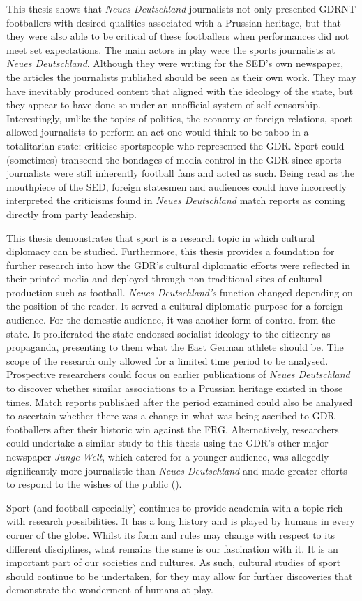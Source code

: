 This thesis shows that \textit{Neues Deutschland} journalists not only presented GDRNT footballers with desired qualities associated with a Prussian heritage, but that they were also able to be critical of these footballers when performances did not meet set expectations. The main actors in play were the sports journalists at \textit{Neues Deutschland}. Although they were writing for the SED’s own newspaper, the articles the journalists published should be seen as their own work. They may have inevitably produced content that aligned with the ideology of the state, but they appear to have done so under an unofficial system of self-censorship. Interestingly, unlike the topics of politics, the economy or foreign relations, sport allowed journalists to perform an act one would think to be taboo in a totalitarian state: criticise sportspeople who represented the GDR. Sport could (sometimes) transcend the bondages of media control in the GDR since sports journalists were still inherently football fans and acted as such. Being read as the mouthpiece of the SED, foreign statesmen and audiences could have incorrectly interpreted the criticisms found in \textit{Neues Deutschland} match reports as coming directly from party leadership.

This thesis demonstrates that sport is a research topic in which cultural diplomacy can be studied. Furthermore, this thesis provides a foundation for further research into how the GDR’s cultural diplomatic efforts were reflected in their printed media and deployed through non-traditional sites of cultural production such as football. \textit{Neues Deutschland’s} function changed depending on the position of the reader. It served a cultural diplomatic purpose for a foreign audience. For the domestic audience, it was another form of control from the state. It proliferated the state-endorsed socialist ideology to the citizenry as propaganda, presenting to them what the East German athlete should be. The scope of the research only allowed for a limited time period to be analysed. Prospective researchers could focus on earlier publications of \textit{Neues Deutschland} to discover whether similar associations to a Prussian heritage existed in those times. Match reports published after the period examined could also be analysed to ascertain whether there was a change in what was being ascribed to GDR footballers after their historic win against the FRG. Alternatively, researchers could undertake a similar study to this thesis using the GDR’s other major newspaper \textit{Junge Welt}, which catered for a younger audience, was allegedly significantly more journalistic than \textit{Neues Deutschland} and made greater efforts to respond to the wishes of the public (\cite{meyenschweiger2008}).

Sport (and football especially) continues to provide academia with a topic rich with research possibilities. It has a long history and is played by humans in every corner of the globe. Whilst its form and rules may change with respect to its different disciplines, what remains the same is our fascination with it. It is an important part of our societies and cultures. As such, cultural studies of sport should continue to be undertaken, for they may allow for further discoveries that demonstrate the wonderment of humans at play.